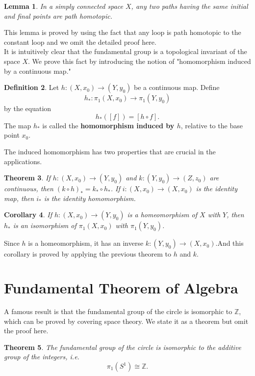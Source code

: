 \documentclass[psamsfonts]{amsart}
\newtheorem{thm}{Theorem}[section]
\newtheorem{cor}[thm]{Corollary}
\newtheorem{lem}[thm]{Lemma}
\theoremstyle{definition}
\newtheorem{defn}[thm]{Definition}
\theoremstyle{remark}
\numberwithin{equation}{section}
\begin{document}
	\begin{lem}
		In a simply connected space $X$, any two paths having the same initial and final points are path homotopic.
	\end{lem}
	This lemma is proved by using the fact that any loop is path homotopic to the constant loop and we omit the detailed proof here.\\
	It is intuitively clear that the fundamental group is a topological invariant of the space $X$. We prove this fact by introducing the notion of "homomorphism induced by a continuous map."
	\begin{defn}
		Let $h: (X,x_0) \to (Y,y_0)$ be a continuous map. Define
		\begin{equation}
			h_*:\pi_1(X,x_0) \to \pi_1(Y,y_0)
		\end{equation}
		by the equation
		\begin{equation}
			h_*([f])=[h \circ f].
		\end{equation}
		The map $h_*$ is called the \textbf{homomorphism induced by $h$}, relative to the base point $x_0$.
	\end{defn}
	The induced homomorphism has two properties that are crucial in the applications.
	\begin{thm}
		If $h:(X,x_0)\to (Y,y_0)$ and $k:(Y,y_0)\to (Z,z_0)$ are continuous, then $(k \circ h)_* = k_* \circ h_*$. If $i:(X,x_0) \to (X,x_0)$ is the identity map, then $i_*$ is the identity homomorphism. 
	\end{thm}
	
	\begin{cor}
		If $h:(X,x_0) \to (Y,y_0)$ is a homeomorphism of $X$ with $Y$, then $h_*$ is an isomorphism of $\pi_1(X,x_0)$ with $\pi_1(Y,y_0)$.
	\end{cor}
	Since $h$ is a homeomorphism, it has an inverse $k:(Y,y_0) \to (X,x_0)$.And this corollary is proved by applying the previous theorem to $h$ and $k$.
	
\section{Fundamental Theorem of Algebra}
	A famous result is that the fundamental group of the circle is isomorphic to $\mathbb{Z}$, which can be proved by covering space theory. We state it as a theorem but omit the proof here.
	\begin{thm}
		The fundamental group of the circle is isomorphic to the additive group of the integers, i.e.
		\begin{equation}
			\pi_1(S^1) \cong \mathbb{Z}.
		\end{equation}
	\end{thm}
	
\end{document}
